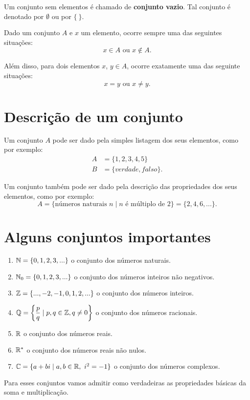 Um conjunto sem elementos é chamado de \textbf{conjunto vazio}. Tal conjunto é denotado por $\emptyset$ ou por $\{\ \}$.

Dado um conjunto $A$ e $x$ um elemento, ocorre sempre uma das seguintes situações:
\[
    x \in A \mbox{ ou } x \notin A.
\]

Além disso, para dois elementos $x$, $y \in A$, ocorre exatamente uma das seguinte situações:
\[
    x = y \mbox{ ou } x \neq y.
\]

\section{Descrição de um conjunto}

Um conjunto $A$ pode ser dado pela simples listagem dos seus elementos, como por exemplo:
\begin{align*}
    A &= \{1,2,3,4,5\}\\
    B &= \{verdade, falso\}.
\end{align*}

Um conjunto também pode ser dado pela descrição das propriedades dos seus elementos, como por exemplo:
\[
    A = \{\mbox{números naturais\ } n \mid n \mbox{ é múltiplo de } 2\} = \{2,4,6,...\}.
\]

\section{Alguns conjuntos importantes}
\begin{enumerate}[label={\arabic*})]
    \item $\mathbb{N} = \{0,1,2,3,...\}$ o conjunto dos números naturais.
    \item $\mathbb{N}_0 = \{0,1,2,3,...\}$ o conjunto dos números inteiros não negativos.
    \item $\mathbb{Z} = \{...,-2,-1,0,1,2,...\}$ o conjunto dos números inteiros.
    \item $\mathbb{Q} = \left\{\dfrac{p}{q} \mid p,q \in \mathbb{Z}, q \neq 0 \right\}$ o conjunto dos números racionais.
    \item $\mathbb{R} $ o conjunto dos números reais.
    \item $\mathbb{R}^*$ o conjunto dos números reais não nulos.
    \item $\mathbb{C} = \{a + bi \mid a,b \in \mathbb{R},\ i^2 = -1\}$ o conjunto dos números complexos.
\end{enumerate}

\begin{observacao}
    Para esses conjuntos vamos admitir como verdadeiras as propriedades básicas da soma e multiplicação.
\end{observacao}
